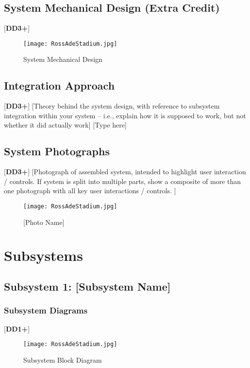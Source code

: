 \documentclass[letterpaper, 11pt]{article}
\begin{document}
\clearpage
\subsection{System Mechanical Design (Extra Credit)}
[\textbf{DD3+}]
\begin{figure}[h]
    \centering
    \texttt{[image: RossAdeStadium.jpg]} %
    \caption{System Mechanical Design}
\end{figure}

\clearpage
\subsection{Integration Approach}
[\textbf{DD3+}]
[Theory behind the system design, with reference to subsystem integration within your system – i.e., explain how it is supposed to work, but not whether it did actually work]
[Type here]

\clearpage
\subsection{System Photographs} %
[\textbf{DD3+}]
[Photograph of assembled system, intended to highlight user interaction / controls. If system is split into multiple parts, show a composite of more than one photograph with all key user interactions / controls. ]
\begin{figure}[h]
    \centering
    \texttt{[image: RossAdeStadium.jpg]} %
    \caption{[Photo Name]}
\end{figure}

\clearpage
\section{Subsystems}

\subsection{Subsystem 1: [Subsystem Name]}

\subsubsection{Subsystem Diagrams}
[\textbf{DD1+}]
\begin{figure}[h]
    \centering
    \texttt{[image: RossAdeStadium.jpg]} %
    \caption{Subsystem Block Diagram}
\end{figure} %
\end{document}
